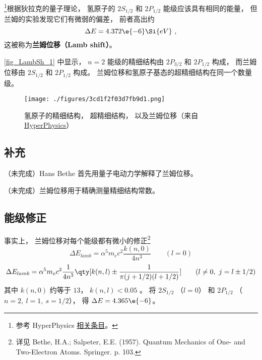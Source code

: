 
\begin{issues}
\issueDraft
\issueMissDepend
\end{issues}


\footnote{参考 HyperPhysics \href{http://hyperphysics.phy-astr.gsu.edu/hbase/quantum/lamb.html}{相关条目}。}根据狄拉克的量子理论， 氢原子的 $2S_{1/2}$ 和 $2P_{1/2}$ 能级应该具有相同的能量， 但兰姆的实验发现它们有微弱的偏差， 前者高出约
\begin{equation}
\Delta E = 4.372\e{-6} \Si{eV}~,
\end{equation}
这被称为\textbf{兰姆位移（Lamb shift）}。

\autoref{fig_LambSh_1} 中显示， $n=2$ 能级的精细结构由 $2P_{3/2}$ 和 $2P_{1/2}$ 构成， 而兰姆位移由 $2S_{1/2}$ 和 $2P_{1/2}$ 构成。 兰姆位移和氢原子基态的超精细结构在同一个数量级。 
\begin{figure}[ht]
\centering
\texttt{[image: ./figures/3cd1f2f03d7fb9d1.png]}
\caption{氢原子的精细结构， 超精细结构， 以及兰姆位移（来自 \href{http://hyperphysics.phy-astr.gsu.edu/hbase/quantum/lamb.html}{HyperPhysics}）} \label{fig_LambSh_1}
\end{figure} %

\subsection{补充}
（未完成）Hans Bethe 首先用量子电动力学解释了兰姆位移。

（未完成）兰姆位移用于精确测量精细结构常数。

\subsection{能级修正}
事实上， 兰姆位移对每个能级都有微小的修正\footnote{详见 Bethe, H.A.; Salpeter, E.E. (1957). Quantum Mechanics of One- and Two-Electron Atoms. Springer. p. 103.}
\begin{equation}
\Delta E_{lamb} = \alpha^5 m_e c^2 \frac{k(n, 0)}{4n^3} \qquad (l = 0)
\end{equation}
\begin{equation}
\Delta E_{lamb} =\alpha^5 m_e c^2 \frac{1}{4n^3} \qty[k(n,l) \pm \frac{1}{\pi(j+1/2)(l+1/2)} ] \qquad (l \ne 0,\ j = l \pm 1/2)
\end{equation}
其中 $k(n, 0)$ 约等于 $13$， $k(n, l) < 0.05$ 。 将 $2S_{1/2}$ （$l = 0$） 和 $2P_{1/2}$ （$n = 2,\ l = 1,\ s = 1/2$）， 得 $\Delta E = 4.365\e{-6}$。
